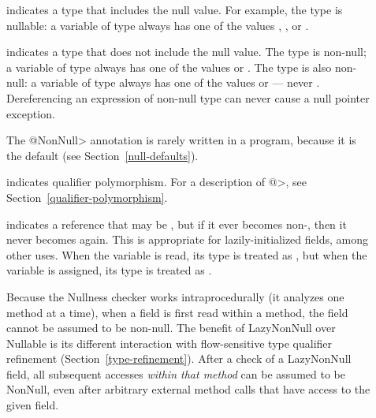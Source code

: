 \begin{description}

\item[]
  indicates a type that includes the null value.  For example, the type 
  is nullable:  a variable of type  always has one of the
  values , , or .

\item[]
  indicates a type that does not include the null value.  The type
   is non-null; a variable of type  always has
  one of the values  or .  The type  is also non-null:  a variable of type 
  always has one of the values  or  --- never
  .  Dereferencing an expression of non-null type can never cause
  a null pointer exception.

  The \<@NonNull> annotation is rarely written in a program, because it is
  the default (see Section~\ref{null-defaults}).

\item[]
  indicates qualifier polymorphism.  For a description of
  \<@>, see
  Section~\ref{qualifier-polymorphism}.

\item[]
  indicates a reference that may be , but if it ever becomes
  non-, then it never becomes  again.  This is
  appropriate for lazily-initialized fields, among other uses.  When the
  variable is read, its type is treated as
  , but when the variable is
  assigned, its type is treated as
  .

  Because the Nullness checker works intraprocedurally (it analyzes one
  method at a time), when a  field is first read within a
  method, the field cannot be assumed to be non-null.  The benefit of
  LazyNonNull over Nullable is its different interaction with
  flow-sensitive type qualifier refinement (Section~\ref{type-refinement}).
  After a check of a LazyNonNull
  field, all subsequent accesses \emph{within that method} can be assumed
  to be NonNull, even after arbitrary external method calls that have
  access to the given field.

\end{description}

